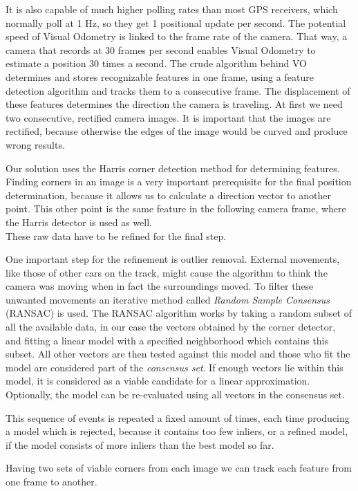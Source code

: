It is also capable of much higher polling rates than most GPS receivers, which normally poll at 1 Hz, so they get 1 positional update per second. The potential speed of Visual Odometry is linked to the frame rate of the camera. That way, a camera that records at 30 frames per second enables Visual Odometry to estimate a position 30 times a second. 
The crude algorithm behind VO determines and stores recognizable features in one frame, using a feature detection algorithm and tracks them to a consecutive frame. The displacement of these features determines the direction the camera is traveling.
At first we need two consecutive, rectified camera images. It is important that the images are rectified, because otherwise the edges of the image would be curved and produce wrong results.

Our solution uses the Harris corner detection method \cite{harris88} for determining features. Finding corners in an image is a very important prerequisite for the final position determination, because it allows us to calculate a direction vector to another point. This other point is the same feature in the following camera frame, where the Harris detector is used as well.\\
These raw data have to be refined for the final step.

One important step for the refinement is outlier removal. External movements, like those of other cars on the track, might cause the algorithm to think the camera was moving when in fact the surroundings moved.
To filter these unwanted movements an iterative method called \textit{Random Sample Consensus} (RANSAC) is used. 
The RANSAC algorithm works by taking a random subset of all the available data, in our case the vectors obtained by the corner detector, and fitting a linear model with a specified neighborhood which contains this subset. All other vectors are then tested against this model and those who fit the model are considered part of the \textit{consensus set}.
If enough vectors lie within this model, it is considered as a viable candidate for a linear approximation. Optionally, the model can be re-evaluated using all vectors in the consensus set.

This sequence of events is repeated a fixed amount of times, each time producing a model which is rejected, because it contains too few inliers, or a refined model, if the model consists of more inliers than the best model so far.

Having two sets of viable corners from each image we can track each feature from one frame to another. 

